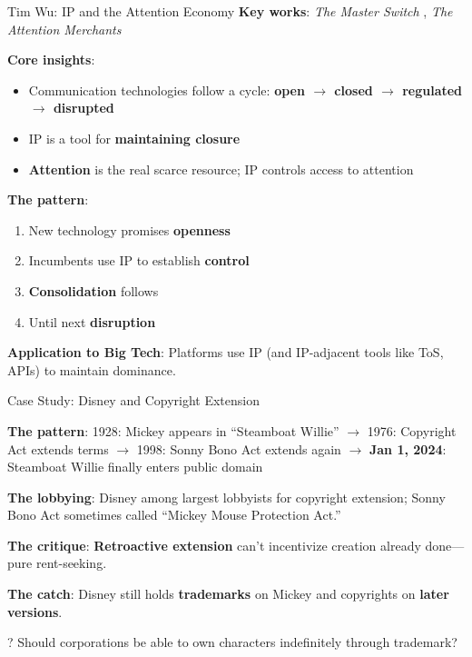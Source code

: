 \documentclass[aspectratio=169]{beamer}
\begin{document}
\begin{frame}{Tim Wu: IP and the Attention Economy}
\textbf{Key works}: \textit{The Master Switch} \parencite{wu_master_switch}, \textit{The Attention Merchants} \parencite{wu_attention_merchants}

\vspace{0.2cm}
\textbf{Core insights}:
\begin{itemize}
    \item Communication technologies follow a cycle: \textbf{open $\rightarrow$ closed $\rightarrow$ regulated $\rightarrow$ disrupted}
    \item IP is a tool for \textbf{maintaining closure}
    \item \textbf{Attention} is the real scarce resource; IP controls access to attention
\end{itemize}

\vspace{0.3cm}
\textbf{The pattern}:
\begin{enumerate}
    \item New technology promises \textbf{openness}
    \item Incumbents use IP to establish \textbf{control}
    \item \textbf{Consolidation} follows
    \item Until next \textbf{disruption}
\end{enumerate}

\vspace{0.2cm}
\textbf{Application to Big Tech}: Platforms use IP (and IP-adjacent tools like ToS, APIs) to maintain dominance.
\end{frame}

\begin{frame}{Case Study: Disney and Copyright Extension}
\begin{casestudybox}
\textbf{The pattern}: 1928: Mickey appears in ``Steamboat Willie'' $\rightarrow$ 1976: Copyright Act extends terms $\rightarrow$ 1998: Sonny Bono Act extends again $\rightarrow$ \textbf{Jan 1, 2024}: Steamboat Willie finally enters public domain
\end{casestudybox}

\vspace{0.2cm}
\textbf{The lobbying}: Disney among largest lobbyists for copyright extension; Sonny Bono Act sometimes called ``Mickey Mouse Protection Act.''

\vspace{0.1cm}
\textbf{The critique}: \textbf{Retroactive extension} can't incentivize creation already done---pure rent-seeking.

\vspace{0.1cm}
\textbf{The catch}: Disney still holds \textbf{trademarks} on Mickey and copyrights on \textbf{later versions}.

\begin{alertblock}{?}
Should corporations be able to own characters indefinitely through trademark?
\end{alertblock}
\end{frame}
\end{document}
